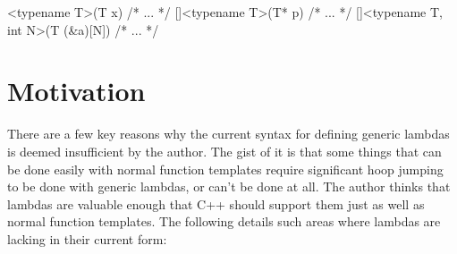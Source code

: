\documentclass{wg21}
\begin{document}
\begin{cpp}
[]<typename T>(T x) { /* ... */ }
[]<typename T>(T* p) { /* ... */ }
[]<typename T, int N>(T (&a)[N]) { /* ... */ }
\end{cpp}


\section{Motivation} \label{motivation}
There are a few key reasons why the current syntax for defining generic lambdas
is deemed insufficient by the author. The gist of it is that some things that
can be done easily with normal function templates require significant hoop
jumping to be done with generic lambdas, or can't be done at all. The author
thinks that lambdas are valuable enough that C++ should support them just as
well as normal function templates. The following details such areas where
lambdas are lacking in their current form:
\end{document}
